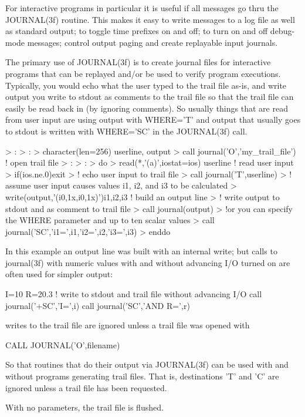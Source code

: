\begin{DoxyVerb}For interactive programs in particular it is useful if all messages
go thru the JOURNAL(3f) routine. This makes it easy to write messages
to a log file as well as standard output; to toggle time prefixes
on and off; to turn on and off debug-mode messages; control output
paging and create replayable input journals.

The primary use of JOURNAL(3f) is to create journal files for
interactive programs that can be replayed and/or be used to verify
program executions. Typically, you would echo what the user typed to
the trail file as-is, and write output you write to stdout as comments
to the trail file so that the trail file can easily be read back in
(by ignoring comments). So usually things that are read from user
input are using output with WHERE='T' and output that usually goes
to stdout is written with WHERE='SC' in the JOURNAL(3f) call.

 >      :
 >      :
 > character(len=256) userline, output
 > call journal('O','my_trail_file')  ! open trail file
 >      :
 >      :
 > do
 >    read(*,'(a)',iostat=ios) userline  ! read user input
 >    if(ios.ne.0)exit
 >    ! echo user input to trail file
 >    call journal('T',userline)
 >    ! assume user input causes values i1, i2, and i3 to be calculated
 >    write(output,'(i0,1x,i0,1x)')i1,i2,i3 ! build an output line
 >    ! write output to stdout and as comment to trail file
 >    call journal(output)
 >    !or you can specify the WHERE parameter and up to ten scalar values
 >    call journal('SC','i1=',i1,'i2=',i2,'i3=',i3)
 > enddo

In this example an output line was built with an internal write; but calls
to journal(3f) with numeric values with and without advancing I/O turned on
are often used for simpler output:

   I=10
   R=20.3
   ! write to stdout and trail file without advancing I/O
   call journal('+SC','I=',i)
   call journal('SC','AND R=',r)

writes to the trail file are ignored unless a trail file was opened with

   CALL JOURNAL('O',filename)


So that routines that do their output via JOURNAL(3f) can be used with and
without programs generating trail files. That is, destinations 'T' and 'C'
are ignored unless a trail file has been requested.

With no parameters, the trail file is flushed.
\end{DoxyVerb}


